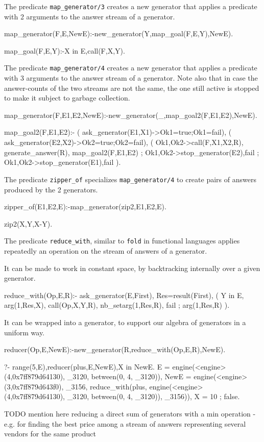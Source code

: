 \documentclass{new_tlp}
\begin{document}
The predicate {\tt map\_generator/3} creates a new generator that
applies a predicate with 2 arguments to the answer stream  of a generator.
\begin{code}
map_generator(F,E,NewE):-new_generator(Y,map_goal(F,E,Y),NewE).

map_goal(F,E,Y):-X in E,call(F,X,Y).
\end{code}

The predicate {\tt map\_generator/4} creates a new generator that
applies a predicate with 3 arguments to the answer stream  of a generator.
Note also that in case the answer-counts of the two streams are not the same, the one
still active is stopped to make it subject to garbage collection.
\begin{code}
map_generator(F,E1,E2,NewE):-new_generator(_,map_goal2(F,E1,E2),NewE).

map_goal2(F,E1,E2):-
  ( ask_generator(E1,X1)->Ok1=true;Ok1=fail),
  ( ask_generator(E2,X2)->Ok2=true;Ok2=fail),
  ( Ok1,Ok2->call(F,X1,X2,R),
    generate_answer(R),
    map_goal2(F,E1,E2)
  ; \+Ok1,Ok2->stop_generator(E2),fail
  ; Ok1,\+Ok2->stop_generator(E1),fail
  ).
\end{code}

The predicate {\tt zipper\_of} specializes {\tt map\_generator/4} to create
pairs of answers produced by the 2 generators.
\begin{code}
zipper_of(E1,E2,E):-map_generator(zip2,E1,E2,E).

zip2(X,Y,X-Y).
\end{code}
The predicate {\tt reduce\_with}, similar to {\tt fold} in functional languages
applies repeatedly an operation on the stream of answers of a generator.

It can be made to work in constant space, by
backtracking internally over a given generator.
\begin{code}
reduce_with(Op,E,R):-
  ask_generator(E,First),
  Res=result(First),
  ( Y in E,
    arg(1,Res,X),
    call(Op,X,Y,R),
    nb_setarg(1,Res,R),
    fail
  ; arg(1,Res,R)
  ).
\end{code}

It can be wrapped into a generator, to support our algebra of generators in a uniform way.

\begin{code}
reducer(Op,E,NewE):-new_generator(R,reduce_with(Op,E,R),NewE).
\end{code}

\BX
\begin{codex}
?- range(5,E),reducer(plus,E,NewE),X in NewE.
E = engine(<engine>(4,0x7ff879d64130), _3120, between(0, 4, _3120)),
NewE = engine(<engine>(3,0x7ff879d643f0), _3156, reduce_with(plus,
engine(<engine>(4,0x7ff879d64130), _3120, between(0, 4, _3120)), _3156)),
X = 10 ;
false.
\end{codex}
\EX
\BI
\I TODO mention here reducing a direct sum of generators with a min operation - e.g. for finding the best price among a stream of answers representing several vendors for the same product
\EI
\end{document}

